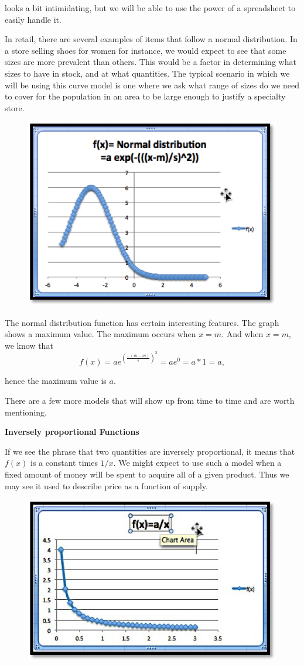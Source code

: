 \documentclass[10pt,]{book}
\newcommand{\terminology}[1]{\textbf{#1}}
\theoremstyle{plain}
\theoremstyle{definition}
\theoremstyle{definition}
\begin{document}
looks a bit intimidating, but we will be able to use the power of a spreadsheet to easily handle it. %
\par
In retail, there are several examples of items that follow a normal distribution. In a store selling shoes for women for instance, we would expect to see that some sizes are more prevalent than others. This would be a factor in determining what sizes to have in stock, and at what quantities. 
The typical scenario in which we will be using this curve model is one where we ask what range of sizes do we need to cover for the population in an area to be large enough to justify a specialty store.%
\leavevmode%
\begin{figure}
\centering
\includegraphics[width=0.5\linewidth]{images/sec1-2-NormalCurve.png}
\end{figure}
\par
The normal distribution function has certain interesting features. The graph shows a maximum value. The maximum occurs when \(x = m\). And when \(x = m\), we know that %
\begin{equation*}f(x)=a e^{\left(\frac{-(m-m)}{s}\right)^2}=a e^0=a*1=a,\end{equation*}\par
 hence the maximum value is \(a\).%
\par
There are a few more models that will show up from time to time and are worth mentioning.%
\par

\terminology{Inversely proportional Functions}%
\par
If we see the phrase that two quantities are inversely proportional, it means that \(f(x)\) is a constant times \(1/x\).  We might expect to use such a model when a fixed amount of money will be spent to acquire all of a given product.  Thus we may see it used to describe price as a function of supply.%
\leavevmode%
\begin{figure}
\centering
\includegraphics[width=0.5\linewidth]{images/sec1-2-InverseCurve.png}
\end{figure}
\par
\end{document}
